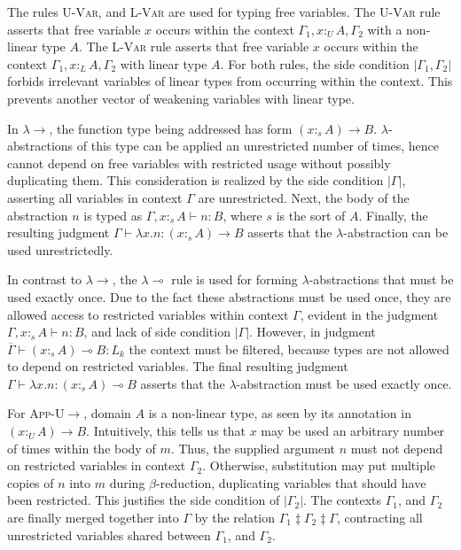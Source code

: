 \documentclass[sigplan,screen,review,authordraft]{acmart}
\newcommand{\rname}[1]{\textsc{\footnotesize #1}}
\newcommand{\pure}[1]{|#1|}
\newcommand{\utype}{:_{\scriptscriptstyle U}}
\newcommand{\ltype}{:_{\scriptscriptstyle L}}
\newcommand{\stype}[1]{:_#1}
\newcommand{\mrg}[3]{#1\ddagger#2\ddagger#3}
\begin{document}
The rules \rname{U-Var}, and \rname{L-Var} are used for typing free variables. The \rname{U-Var} rule asserts that free variable $x$ occurs within the context $\Gamma_1, x \utype A, \Gamma_2$ with a non-linear type $A$. The \rname{L-Var} rule asserts that free variable $x$ occurs within the context $\Gamma_1, x \ltype A, \Gamma_2$ with linear type $A$. For both rules, the side condition $\pure{\Gamma_1, \Gamma_2}$ forbids irrelevant variables of linear types from occurring within the context. This prevents another vector of weakening variables with linear type.

In \rname{$\lambda$$\rightarrow$}, the function type being addressed has form $(x \stype{s} A) \rightarrow B$. $\lambda$-abstractions of this type can be applied an unrestricted number of times, hence cannot depend on free variables with restricted usage without possibly duplicating them. This consideration is realized by the side condition $\pure{\Gamma}$, asserting all variables in context $\Gamma$ are unrestricted. Next, the body of the abstraction $n$ is typed as $\Gamma, x \stype{s} A \vdash n : B$, where $s$ is the sort of $A$. Finally, the resulting judgment $\Gamma \vdash \lambda x.n : (x \stype{s} A) \rightarrow B$ asserts that the $\lambda$-abstraction can be used unrestrictedly.

In contrast to \rname{$\lambda$$\rightarrow$}, the \rname{$\lambda$$\multimap$} rule is used for forming $\lambda$-abstractions that must be used exactly once. Due to the fact these abstractions must be used once, they are allowed access to restricted variables within context $\Gamma$, evident in the judgment $\Gamma, x \stype{s} A \vdash n : B$, and lack of side condition $\pure{\Gamma}$. However, in judgment $\overline{\Gamma} \vdash (x \stype{s} A) \multimap B : L_k$ the context must be filtered, because types are not allowed to depend on restricted variables. The final resulting judgment $\Gamma \vdash \lambda x.n : (x \stype{s} A) \multimap B$ asserts that the $\lambda$-abstraction must be used exactly once.

For \rname{App-U$\rightarrow$}, domain $A$ is a non-linear type, as seen by its annotation in $(x \utype A) \rightarrow B$. Intuitively, this tells us that $x$ may be used an arbitrary number of times within the body of $m$. Thus, the supplied argument $n$ must not depend on restricted variables in context $\Gamma_2$. Otherwise, substitution may put multiple copies of $n$ into $m$ during $\beta$-reduction, duplicating variables that should have been restricted. This justifies the side condition of $\pure{\Gamma_2}$. The contexts $\Gamma_1$, and $\Gamma_2$ are finally merged together into $\Gamma$ by the relation $\mrg{\Gamma_1}{\Gamma_2}{\Gamma}$, contracting all unrestricted variables shared between $\Gamma_1$, and $\Gamma_2$.
\end{document}
